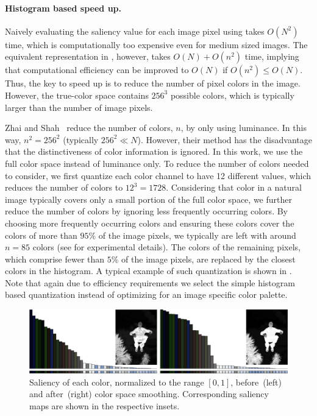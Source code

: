 \documentclass[final]{cvpr}
\newcommand{\vnudge}{\vspace*{-.1in}}
\newcommand{\mypara}[1]{\paragraph{#1.}}
\begin{document}
\vnudge
\mypara{Histogram based speed up} Naively evaluating the saliency value for each image
pixel using  takes $O(N^2)$ time, which is
computationally too expensive even for medium sized images.
%
The equivalent representation in , however, takes $O(N) + O(n^2)$ time,
implying that computational efficiency can be improved to $O(N)$ if $O(n^2) \leq O(N)$.
%
Thus, the key to speed up is to reduce the number of pixel colors in the image.
However, the true-color space contains $256^3$ possible colors,
which is typically larger than the number of image pixels.


Zhai and Shah~\cite{06acmmm/ZhaiS_spatiotemporal} reduce the number of colors, $n$,
by only using luminance. In this way, $n^2=256^2$ (typically $256^2 \ll N$).
However, their method has the disadvantage that the distinctiveness of color information is ignored.
%
In this work, we use the full color space instead of luminance only.
To reduce the number of colors needed to consider, we first quantize each color channel to have 12 different values,
which reduces the number of colors to $12^3=1728$.
%
Considering that color in a natural image typically covers only a small portion of the full color space,
we further reduce the number of colors by ignoring less frequently occurring colors.
%
By choosing more frequently occurring colors and ensuring these colors cover the colors of more
than $95\%$ of the image pixels, we typically are left with around $n=85$ colors (see
 for experimental details).
%
The colors of the remaining pixels, which comprise fewer than $5\%$ of the image pixels,
are replaced by the closest colors in the histogram. A typical example of such
quantization is shown in .
%
Note that again due to efficiency requirements we select the simple histogram based quantization
instead of optimizing for an image specific color palette.


\begin{figure}
    \centering
    \includegraphics[width=\columnwidth]{histogram_saliency.pdf}
    \caption{Saliency of each color, normalized to the range $[0,1]$,
        before~(left) and after~(right) color space smoothing.
        Corresponding saliency maps are shown in the respective insets.
    }\label{fig:HCSmoothing} \vnudge
\end{figure}
\end{document}
